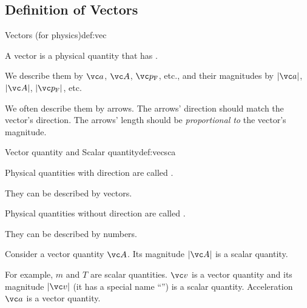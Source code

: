 \documentclass[11pt,pdfa,lastpage]{MishoNote}
\begin{document}
\subsection{Definition of Vectors}
\begin{definition}{Vectors (for physics)}{def:vec}
\begin{miniitemize}
  \item A vector is a physical quantity that has .
  \item We describe them by $\vc a$, $\vc A$, $\vc p\w F$, etc.,
    and their magnitudes by $|\vc a|$, $|\vc A|$, $|\vc p\w F|$, etc.
  \item We often describe them by arrows. The arrows' direction should match the vector's direction. The arrows' length should be \emph{proportional to} the vector's magnitude.
\end{miniitemize}
\end{definition}
\OutputNote

\begin{definition}{Vector quantity and Scalar quantity}{def:vecsca}
  \begin{miniitemize}
    \item Physical quantities with direction are called .
    \begin{miniitemize} \item They can be described by vectors. \end{miniitemize}
    \item Physical quantities without direction are called .
    \begin{miniitemize} \item They can be described by numbers. \end{miniitemize}
    \item Consider a vector quantity $\vc A$. Its magnitude $|\vc A|$ is a scalar quantity.
  \end{miniitemize}
  \end{definition}
\OutputNote
For example,  $m$ and  $T$ are scalar quantities.  $\vc v$ is a vector quantity and its magnitude $|\vc v|$ (it has a special name ``'')  is a scalar quantity. Acceleration $\vc a$ is a vector quantity.
\end{document}
